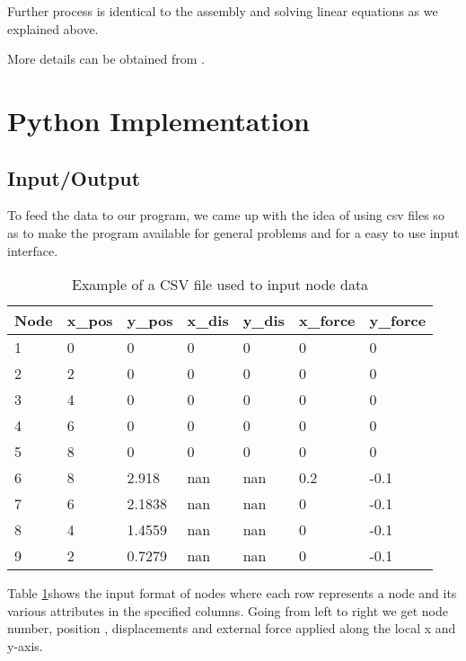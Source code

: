 Further process is identical to the assembly and solving linear equations as we explained above.

More details can be obtained from \cite{oden2012introduction}. 
\pagebreak
\section{\bf Python Implementation}

\subsection*{Input/Output}
To feed the data to our program, we came up with the idea of using csv files so as to make the program available for general problems and for a easy to use input interface.\\


\begin{table}[h!]
	\centering
	\begin{tabular}{|l|l|l|l|l|l|l|}
		\hline
		Node & x\_pos & y\_pos & x\_dis & y\_dis & x\_force & y\_force \\
		\hline
		1    & 0      & 0      & 0      & 0      & 0        & 0        \\
		2    & 2      & 0      & 0      & 0      & 0        & 0        \\
		3    & 4      & 0      & 0      & 0      & 0        & 0        \\
		4    & 6      & 0      & 0      & 0      & 0        & 0        \\
		5    & 8      & 0      & 0      & 0      & 0        & 0        \\
		6    & 8      & 2.918  & nan    & nan    & 0.2      & -0.1     \\
		7    & 6      & 2.1838 & nan    & nan    & 0        & -0.1     \\
		8    & 4      & 1.4559 & nan    & nan    & 0        & -0.1     \\
		9    & 2      & 0.7279 & nan    & nan    & 0        & -0.1  	\\
		\hline  
	\end{tabular}
		\caption{Example of a CSV file used to input node data}
	\label{node_csv_table}
\end{table}

Table \ref{node_csv_table}shows the input format of nodes where each row represents a node and its various attributes in the specified columns. Going from left to right we get node number, position , displacements and external force applied along the local x and y-axis.\\

